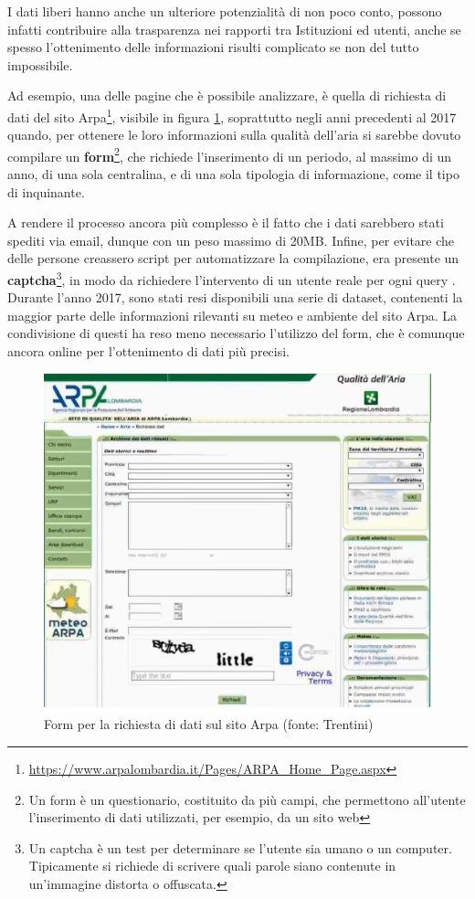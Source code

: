 \documentclass[a4paper]{report}
\newcommand{\engstyle}[1]{\textbf{#1}}
\newcommand{\skipline}{\vspace{0.2in}}
\begin{document}
\skipline
I dati liberi hanno anche un ulteriore potenzialità di non poco conto, 
possono infatti contribuire alla trasparenza nei rapporti tra Istituzioni ed utenti, 
anche se spesso l'ottenimento delle informazioni risulti complicato 
se non del tutto impossibile.

Ad esempio, una delle pagine che è possibile analizzare, è quella di richiesta 
di dati del sito 
Arpa\footnote{\url{https://www.arpalombardia.it/Pages/ARPA_Home_Page.aspx}}, 
visibile in figura \ref{fig:arpa},
soprattutto negli anni precedenti al 2017 quando, per ottenere le loro informazioni 
sulla qualità dell'aria si sarebbe dovuto compilare un 
\engstyle{form}\footnote{Un form è un questionario, costituito da più campi, che 
permettono all'utente l'inserimento di dati utilizzati, per esempio, da un sito web}, 
che richiede l'inserimento di un periodo, al massimo di un anno, di una sola 
centralina, e di una sola tipologia di informazione, come il tipo di inquinante. 

A rendere il processo ancora più complesso è il fatto che i dati sarebbero stati 
spediti via email, dunque con un peso massimo di 20MB. 
Infine, per evitare che delle persone creassero script per automatizzare la compilazione, 
era presente un \engstyle{captcha}\footnote{Un captcha è un test per determinare se l'utente 
sia umano o un computer. Tipicamente si richiede di scrivere quali parole siano 
contenute in un'immagine distorta o offuscata.}, in modo da richiedere l'intervento 
di un utente reale per ogni query \cite{TRENTINI:1}. 
Durante l'anno 2017, sono stati resi disponibili una serie di dataset, contenenti la maggior 
parte delle informazioni rilevanti su meteo e ambiente del sito Arpa. 
La condivisione di questi ha reso meno necessario l'utilizzo del form, che 
è comunque ancora online per l'ottenimento di dati più precisi. 

\begin{figure}
    \hfill\includegraphics[width=0.7\linewidth]{img/arpa.png}\hspace*{\fill}
    \caption{Form per la richiesta di dati sul sito Arpa (fonte: Trentini)}
    \label{fig:arpa}
\end{figure}
\end{document}
